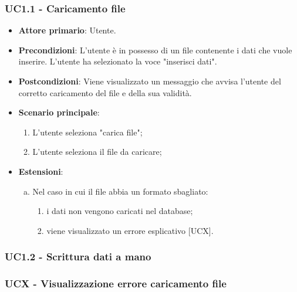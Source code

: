 \subsubsection{UC1.1 - Caricamento file}
\begin{itemize}
	\item \textbf{Attore primario}: Utente.
	\item \textbf{Precondizioni}: L'utente è in possesso di un file contenente i dati che vuole inserire. L'utente ha selezionato la voce "inserisci dati".
	\item \textbf{Postcondizioni}: Viene visualizzato un messaggio che avvisa l'utente del corretto caricamento del file e della sua validità.
	\item \textbf{Scenario principale}:
	\begin{enumerate}
		\item L'utente seleziona "carica file";
		\item L'utente seleziona il file da caricare;
	\end{enumerate}
	\item \textbf{Estensioni}:
	\begin{enumerate}[(a)]
		\item Nel caso in cui il file abbia un formato sbagliato:
		\begin{enumerate}[1.]
			\item i dati non vengono caricati nel database;
			\item viene visualizzato un errore esplicativo [UCX].
		\end{enumerate}
	\end{enumerate}
\end{itemize}
\subsubsection{UC1.2 - Scrittura dati a mano}

\subsubsection{UCX - Visualizzazione errore caricamento file}